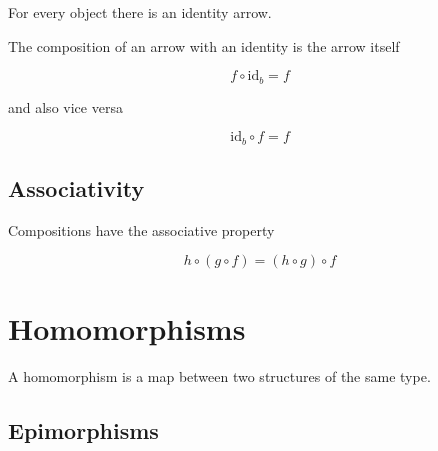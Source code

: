 \documentclass[a4paper]{article}
\begin{document}
For every object there is an identity arrow.

\begin{center}
\end{center}

The composition of an arrow with an identity is the arrow itself

\begin{center}
\end{center}

\[
    f \circ \text{id}_b = f
\]

and also vice versa

\[
    \text{id}_b \circ f = f
\]

\subsection{Associativity}

Compositions have the associative property

\begin{center}
\end{center}

\[
    h \circ (g \circ f) = (h \circ g) \circ f
\]

\pagebreak

\section{Homomorphisms}

A homomorphism is a map between two structures of the same type.

\subsection{Epimorphisms}
\end{document}
